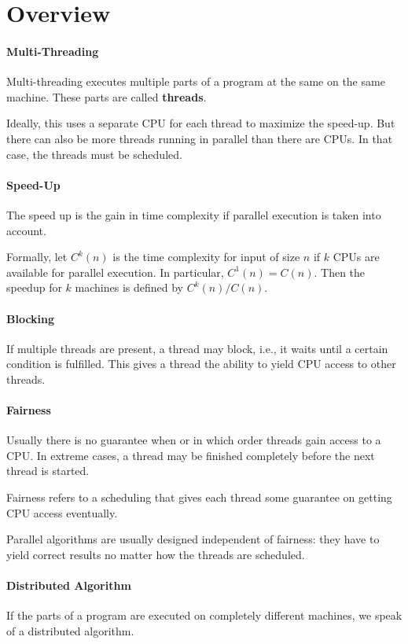 \section{Overview}

\paragraph{Multi-Threading}
Multi-threading executes multiple parts of a program at the same on the same machine.
These parts are called \textbf{threads}.

Ideally, this uses a separate CPU for each thread to maximize the speed-up.
But there can also be more threads running in parallel than there are CPUs.
In that case, the threads must be scheduled.

\paragraph{Speed-Up}
The speed up is the gain in time complexity if parallel execution is taken into account.

Formally, let $C^k(n)$ is the time complexity for input of size $n$ if $k$ CPUs are available for parallel execution.
In particular, $C^1(n)=C(n)$.
Then the speedup for $k$ machines is defined by $C^k(n)/C(n)$.

\paragraph{Blocking}
If multiple threads are present, a thread may block, i.e., it waits until a certain condition is fulfilled.
This gives a thread the ability to yield CPU access to other threads.

\paragraph{Fairness}
Usually there is no guarantee when or in which order threads gain access to a CPU.
In extreme cases, a thread may be finished completely before the next thread is started.

Fairness refers to a scheduling that gives each thread some guarantee on getting CPU access eventually.

Parallel algorithms are usually designed independent of fairness: they have to yield correct results no matter how the threads are scheduled.

\paragraph{Distributed Algorithm}
If the parts of a program are executed on completely different machines, we speak of a distributed algorithm.

